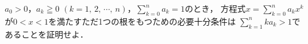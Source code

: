 \documentclass[../../main.tex]{subfiles}
\begin{document}
$a_0>0$，$a_k\geqq0$ $(k=1, \, 2, \, \cdots, \, n)$，$\displaystyle\sum_{k=0}^na_k=1$のとき，
方程式$\displaystyle x=\sum_{k=0}^na_kx^k$が$0<x<1$を満たすただ1つの根をもつための必要十分条件は
$\displaystyle\sum_{k=1}^nka_k>1$であることを証明せよ．
\end{document}
